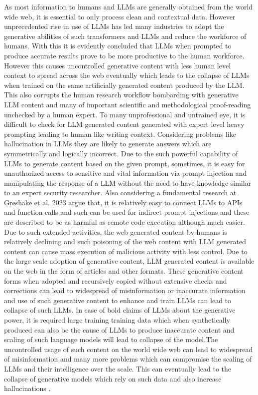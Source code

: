 \documentclass[pdflatex,sn-mathphys-num]{sn-jnl}%
\theoremstyle{thmstyleone}%
\theoremstyle{thmstyletwo}%
\theoremstyle{thmstylethree}%
\begin{document}
As most information to humans and LLMs are generally obtained from the world wide web, it is essential to only process clean and contextual data. However unprecedented rise in use of LLMs has led many industries to adopt the generative abilities of such transformers and LLMs and reduce the workforce of humans. With this it is evidently concluded that LLMs when prompted to produce accurate results prove to be more productive to the human workforce. However this causes uncontrolled generative content with less human level context to spread across the web eventually which leads to the collapse of LLMs when trained on the same artificially generated content produced by the LLM\cite{shumailov2024ai}. This also corrupts the human research workflow bombarding with generative LLM content and many of important scientific and methodological proof-reading unchecked by a human expert. To many unprofessional and untrained eye, it is difficult to check for LLM generated content generated with expert level heavy prompting leading to human like writing context. Considering problems like hallucination in LLMs\cite{huang2023survey} they are likely to generate answers which are symmetrically and logically incorrect. Due to the such powerful capability of LLMs to generate content based on the given prompt, sometimes, it is easy for unauthorized access to sensitive and vital information via prompt injection and manipulating the response of a LLM without the need to have knowledge similar to an expert security researcher\cite{Cohen2024HereCT}. Also considering a fundamental research at Greshake et al. 2023 \cite{2023} argue that, it is relatively easy to connect LLMs to APIs and function calls\cite{func1, func2, func3} and such can be used for indirect prompt injections and these are described to be as harmful as remote code execution although much easier. Due to such extended activities, the web generated content by humans is relatively declining and such poisoning of the web content with LLM generated content can cause mass execution of malicious activity with less control. Due to the large scale adoption of generative content, LLM generated content is available on the web in the form of articles and other formats\cite{villalobos2024position}. These generative content forms when adopted and recursively copied without extensive checks and corrections can lead to widespread of misinformation or inaccurate information and use of such generative content to enhance and train LLMs can lead to collapse of such LLMs. In case of bold claims of LLMs about the generative power, it is required large training training data which when synthetically produced can also be the cause of LLMs to produce inaccurate content and scaling of such language models will lead to collapse of the model\cite{collapse1, collapse2}.The uncontrolled usage of such content on the world wide web can lead to widespread of misinformation and many more problems which can compromise the scaling of LLMs and their intelligence over the scale. This can eventually lead to the collapse of generative models which rely on such data and also increase hallucinations \cite{zhang2024human, long2024llms}.
\end{document}
